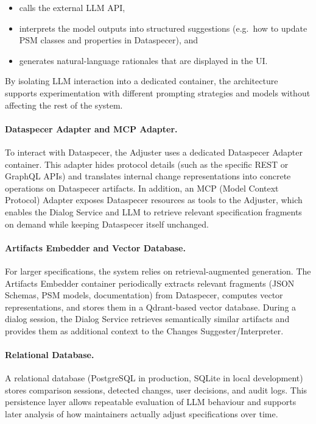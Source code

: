 \begin{itemize}
  \item calls the external LLM API,
  \item interprets the model outputs into structured suggestions (e.g.\ how to
  update PSM classes and properties in Dataspecer), and
  \item generates natural-language rationales that are displayed in the UI.
\end{itemize}

By isolating LLM interaction into a dedicated container, the architecture
supports experimentation with different prompting strategies and models without
affecting the rest of the system.

\paragraph{Dataspecer Adapter and MCP Adapter.}
To interact with Dataspecer, the Adjuster uses a dedicated Dataspecer Adapter
container. This adapter hides protocol details (such as the specific REST or
GraphQL APIs) and translates internal change representations into concrete
operations on Dataspecer artifacts. In addition, an MCP (Model Context
Protocol) Adapter exposes Dataspecer resources as tools to the Adjuster, which
enables the Dialog Service and LLM to retrieve relevant specification fragments
on demand while keeping Dataspecer itself unchanged.

\paragraph{Artifacts Embedder and Vector Database.}
For larger specifications, the system relies on retrieval-augmented generation.
The Artifacts Embedder container periodically extracts relevant fragments
(JSON Schemas, PSM models, documentation) from Dataspecer, computes vector
representations, and stores them in a Qdrant-based vector database. During a
dialog session, the Dialog Service retrieves semantically similar artifacts and
provides them as additional context to the Changes Suggester/Interpreter.

\paragraph{Relational Database.}
A relational database (PostgreSQL in production, SQLite in local development)
stores comparison sessions, detected changes, user decisions, and audit logs.
This persistence layer allows repeatable evaluation of LLM behaviour and
supports later analysis of how maintainers actually adjust specifications over
time.

